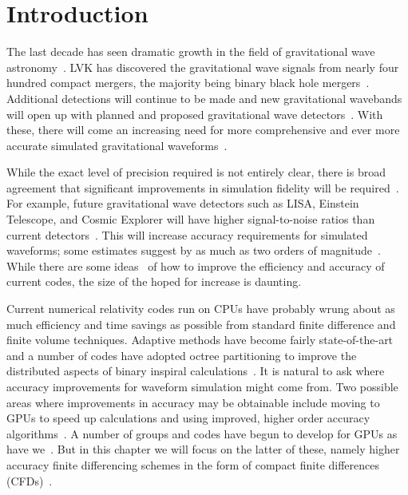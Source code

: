 \section{Introduction}
\label{sec:intro}

The last decade has seen dramatic growth in the field of gravitational wave astronomy~\cite{Abbott2016b,GWTC1,GWTC2,GWTC3,GWTC4,GWTC5}. LVK has discovered the gravitational wave signals from nearly four hundred compact mergers, the majority being binary black hole mergers~\cite{GWTC5}.  Additional detections will continue to be made and new gravitational wavebands will open up with planned and proposed gravitational wave detectors~\cite{Maggiore2020_ET,Reitze2019_CosmicExplorer,Evans2021_CEHorizon}.  With these, there will come an increasing need for more comprehensive and ever more accurate simulated gravitational waveforms~\cite{Lindblom2008AccuracyStandards,Purrer2020_AccuracyRequirements,Jan2024AccuracyLimitations}.  

While the exact level of precision required is not entirely clear, there is broad agreement that significant improvements in simulation fidelity will be required~\cite{Lindblom2008AccuracyStandards,Purrer2020_AccuracyRequirements,Jan2024AccuracyLimitations}.
For example, future gravitational wave detectors such as
LISA, Einstein Telescope, and Cosmic Explorer will have higher signal-to-noise
ratios than current detectors~\cite{Maggiore2020_ET,Reitze2019_CosmicExplorer,Evans2021_CEHorizon}. This will increase accuracy requirements
for simulated waveforms; some estimates suggest by as much as two orders of
magnitude~\cite{Ferguson2021_Readiness,Purrer2020_AccuracyRequirements,Jan2024AccuracyLimitations,Thompson2025_Indistinguishability}.
While there are some ideas~\cite{Fernando2019,Fernando2023,Black2025_ORBIT,Etienne2024,Assumpcao2022_HyperbolicRelaxation,Tootle2025,Lele1992,Daszuta2024} of how to improve the efficiency and accuracy of current codes, the size of the hoped for increase is daunting.

Current numerical relativity codes run on CPUs have probably wrung about as much
efficiency and time savings as possible from standard finite difference
and finite volume techniques.  Adaptive methods have become fairly state-of-the-art
and a number of codes have adopted octree partitioning to improve
the distributed aspects of binary inspiral calculations~\cite{Fernando2019,Fernando2023,Radia2022_AMR,Rashti2024_AMR,Daszuta2024_AdaptiveMeshes}.  It is natural to ask
where accuracy
improvements for waveform simulation might come from.  Two possible areas
where improvements in accuracy may be obtainable include moving to GPUs to speed up calculations and using improved, higher order accuracy algorithms~\cite{Lewis2018_GPU,Tootle2025,AthenaK2024_NR,Lele1992,Daszuta2024}.  A number of groups and codes have begun to develop for GPUs as have we~\cite{Fernando2019}.  But in this chapter we will focus on the latter of these, namely higher accuracy finite
differencing schemes in the form of compact finite differences (CFDs)~\cite{Lele1992,Kim2007,Kim2010,Kim2013,KimSandberg2012,Daszuta2024,WuKim2024}.


